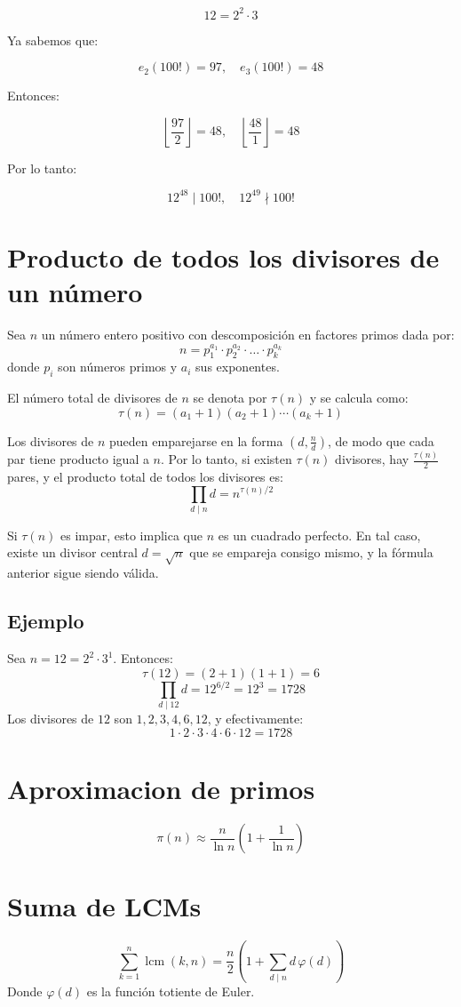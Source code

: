 \documentclass[12pt]{article}
\begin{document}
\[
12 = 2^2 \cdot 3
\]

Ya sabemos que:

\[
e_2(100!) = 97, \quad e_3(100!) = 48
\]

Entonces:

\[
\left\lfloor \frac{97}{2} \right\rfloor = 48, 
\quad 
\left\lfloor \frac{48}{1} \right\rfloor = 48
\]

Por lo tanto:

\[
12^{48} \mid 100!, 
\quad 
12^{49} \nmid 100!
\]


\section{Producto de todos los divisores de un número}

Sea $n$ un número entero positivo con descomposición en factores primos dada por:
\[
n = p_1^{a_1} \cdot p_2^{a_2} \cdot \dots \cdot p_k^{a_k}
\]
donde $p_i$ son números primos y $a_i$ sus exponentes.

El número total de divisores de $n$ se denota por $\tau(n)$ y se calcula como:
\[
\tau(n) = (a_1 + 1)(a_2 + 1) \cdots (a_k + 1)
\]

Los divisores de $n$ pueden emparejarse en la forma $(d, \tfrac{n}{d})$, de modo que cada par tiene producto igual a $n$. 
Por lo tanto, si existen $\tau(n)$ divisores, hay $\tfrac{\tau(n)}{2}$ pares, y el producto total de todos los divisores es:
\[
\boxed{\displaystyle \prod_{d \mid n} d = n^{\tau(n)/2}}
\]

Si $\tau(n)$ es impar, esto implica que $n$ es un cuadrado perfecto. En tal caso, existe un divisor central $d = \sqrt{n}$ 
que se empareja consigo mismo, y la fórmula anterior sigue siendo válida.

\subsection*{Ejemplo}
Sea $n = 12 = 2^2 \cdot 3^1$. Entonces:
\[
\tau(12) = (2 + 1)(1 + 1) = 6
\]
\[
\prod_{d \mid 12} d = 12^{6/2} = 12^3 = 1728
\]
Los divisores de $12$ son $1, 2, 3, 4, 6, 12$, y efectivamente:
\[
1 \cdot 2 \cdot 3 \cdot 4 \cdot 6 \cdot 12 = 1728
\]

\section{Aproximacion de primos}
\[
\pi(n) \approx \frac{n}{\ln n} \left( 1 + \frac{1}{\ln n} \right)
\]

\section{Suma de LCMs}
\[
\sum_{k=1}^{n} \operatorname{lcm}(k,n)
= \frac{n}{2}\left(1 + \sum_{d \mid n} d \,\varphi(d)\right)
\]
Donde $\varphi(d)$ es la función totiente de Euler.
\end{document}
